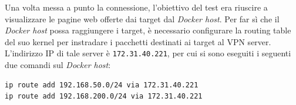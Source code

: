 










Una volta messa a punto la connessione, l'obiettivo del test era riuscire a visualizzare
le pagine web offerte dai target dal \textit{Docker host}.
Per far sì che il \textit{Docker host} possa raggiungere i target, è necessario
configurare la routing table del suo kernel per instradare i pacchetti destinati
ai target al VPN server. L'indirizzo IP di tale server è \texttt{172.31.40.221},
per cui si sono eseguiti i seguenti due comandi sul \textit{Docker host}:
\begin{verbatim}
ip route add 192.168.50.0/24 via 172.31.40.221
ip route add 192.168.200.0/24 via 172.31.40.221
\end{verbatim}

